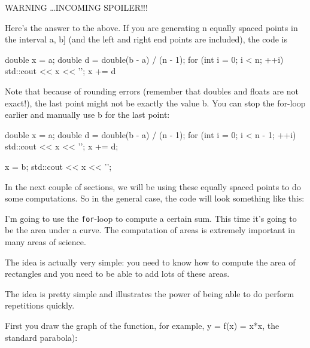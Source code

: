 

WARNING \ldots INCOMING SPOILER!!!

Here's the answer to the above. If you are generating n
equally spaced points in the interval a, b] (and the left and right
end points are included), the code is
\begin{console}
double x = a;
double d = double(b - a) / (n - 1);
for (int i = 0; i < n; ++i)
{   
    std::cout << x << '\n';
    x += d
}
\end{console}

Note that because of rounding errors (remember that doubles and floats
are not exact!), the last point might not be exactly the value b. You
can stop the for-loop earlier and manually use b for the last point:
\begin{console}
double x = a;
double d = double(b - a) / (n - 1);
for (int i = 0; i < n - 1; ++i)
{   
    std::cout << x << '\n';
    x += d;
}

x = b;
std::cout << x << '\n';
\end{console}

In the next couple of sections, we will be using these equally spaced
points to do some computations. So in the general case, the code will
look something like this:

\newpage{}

I'm going to use the \texttt{for}-loop to compute a certain sum.
This time it's going to be the area under a curve. The computation of areas is extremely important in many areas of science.

The idea is actually very simple: you need to know how to compute the area of rectangles and you need to be able to add lots of these areas.

The idea is pretty simple and illustrates the power of being able to do perform repetitions quickly.

First you draw the graph of the function, for example, y = f(x) = x*x, the standard parabola):


